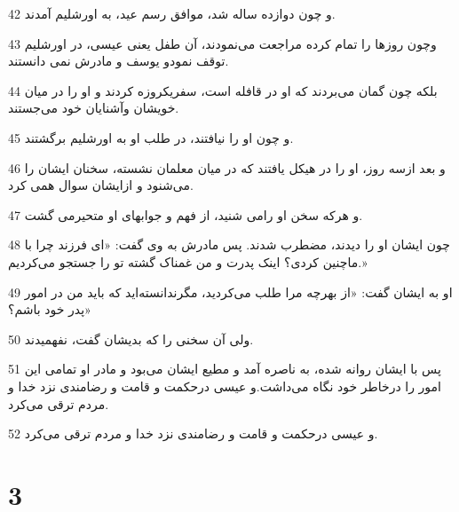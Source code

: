 \par 42 و چون دوازده ساله شد، موافق رسم عید، به اورشلیم آمدند.
\par 43 وچون روزها را تمام کرده مراجعت می‌نمودند، آن طفل یعنی عیسی، در اورشلیم توقف نمودو یوسف و مادرش نمی دانستند.
\par 44 بلکه چون گمان می‌بردند که او در قافله است، سفریکروزه کردند و او را در میان خویشان وآشنایان خود می‌جستند.
\par 45 و چون او را نیافتند، در طلب او به اورشلیم برگشتند.
\par 46 و بعد ازسه روز، او را در هیکل یافتند که در میان معلمان نشسته، سخنان ایشان را می‌شنود و ازایشان سوال همی کرد.
\par 47 و هر‌که سخن او رامی شنید، از فهم و جوابهای او متحیرمی گشت.
\par 48 چون ایشان او را دیدند، مضطرب شدند. پس مادرش به وی گفت: «ای فرزند چرا با ماچنین کردی؟ اینک پدرت و من غمناک گشته تو را جستجو می‌کردیم.»
\par 49 او به ایشان گفت: «از بهر‌چه مرا طلب می‌کردید، مگرندانسته‌اید که باید من در امور پدر خود باشم؟»
\par 50 ولی آن سخنی را که بدیشان گفت، نفهمیدند.
\par 51 پس با ایشان روانه شده، به ناصره آمد و مطیع ایشان می‌بود و مادر او تمامی این امور را درخاطر خود نگاه می‌داشت.و عیسی درحکمت و قامت و رضامندی نزد خدا و مردم ترقی می‌کرد.
\par 52 و عیسی درحکمت و قامت و رضامندی نزد خدا و مردم ترقی می‌کرد.

\chapter{3}


